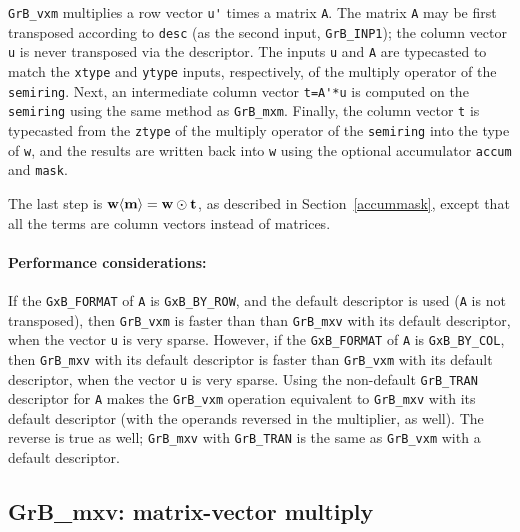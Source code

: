 \documentclass[12pt]{article}
\begin{document}
\verb'GrB_vxm' multiplies a row vector \verb"u'" times a matrix \verb'A'.  The
matrix \verb'A' may be first transposed according to \verb'desc' (as the second
input, \verb'GrB_INP1'); the column vector \verb'u' is never transposed via the
descriptor.  The inputs \verb'u' and \verb'A' are typecasted to match the
\verb'xtype' and \verb'ytype' inputs, respectively, of the multiply operator of
the \verb'semiring'.  Next, an intermediate column vector \verb"t=A'*u" is
computed on the \verb'semiring' using the same method as \verb'GrB_mxm'.
Finally, the column vector \verb't' is typecasted from the \verb'ztype' of the
multiply operator of the \verb'semiring' into the type of \verb'w', and the
results are written back into \verb'w' using the optional accumulator
\verb'accum' and \verb'mask'.

The last step is ${\bf w \langle m \rangle  = w \odot t}$, as described
in Section~\ref{accummask}, except that all the
terms are column vectors instead of matrices.

\paragraph{\bf Performance considerations:} %
If the \verb'GxB_FORMAT' of \verb'A' is \verb'GxB_BY_ROW', and the default
descriptor is used (\verb'A' is not transposed), then \verb'GrB_vxm' is faster
than than \verb'GrB_mxv' with its default descriptor, when the vector \verb'u'
is very sparse.
However, if the \verb'GxB_FORMAT' of \verb'A' is \verb'GxB_BY_COL', then
\verb'GrB_mxv' with its default descriptor is faster than \verb'GrB_vxm' with
its default descriptor, when the vector \verb'u' is very sparse.
Using the non-default \verb'GrB_TRAN' descriptor for \verb'A' makes the
\verb'GrB_vxm' operation equivalent to \verb'GrB_mxv' with its default
descriptor (with the operands reversed in the multiplier, as well).  The
reverse is true as well; \verb'GrB_mxv' with \verb'GrB_TRAN' is the same as
\verb'GrB_vxm' with a default descriptor.

\newpage
\subsection{{\sf GrB\_mxv:} matrix-vector multiply} %
\label{mxv}
\end{document}
